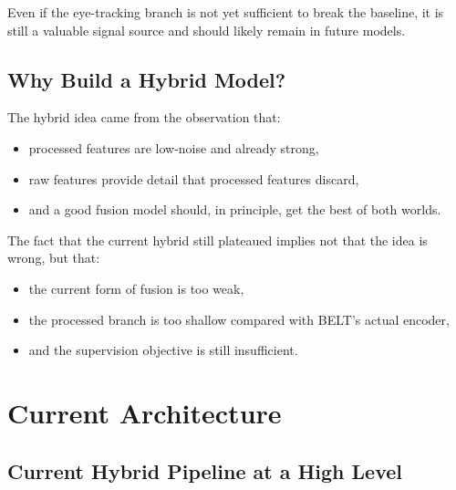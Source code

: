 \documentclass[11pt]{article}
\begin{document}
Even if the eye-tracking branch is not yet sufficient to break the baseline, it is still a valuable signal source and should likely remain in future models.

\subsection{Why Build a Hybrid Model?}

The hybrid idea came from the observation that:
\begin{itemize}
    \item processed features are low-noise and already strong,
    \item raw features provide detail that processed features discard,
    \item and a good fusion model should, in principle, get the best of both worlds.
\end{itemize}

The fact that the current hybrid still plateaued implies not that the idea is wrong, but that:
\begin{itemize}
    \item the current form of fusion is too weak,
    \item the processed branch is too shallow compared with BELT's actual encoder,
    \item and the supervision objective is still insufficient.
\end{itemize}

\section{Current Architecture}

\subsection{Current Hybrid Pipeline at a High Level}
\end{document}
